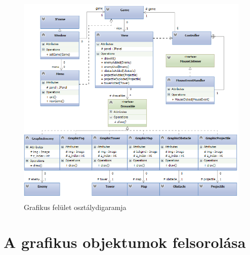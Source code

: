 \begin{figure}[H]
\begin{center}
\includegraphics[width=18cm]{images/ch11/very_uml_class_tiny.png}
\caption{Grafikus felület osztálydigaramja}
\label{fig:Graphic_class_diag}
\end{center}
\end{figure}

\section{A grafikus objektumok felsorolása}

